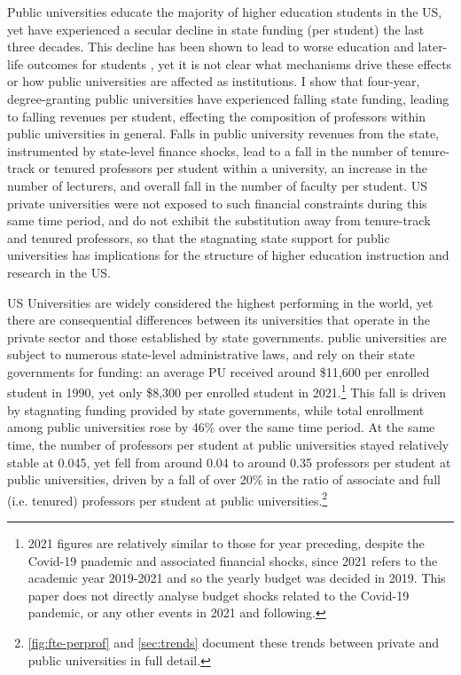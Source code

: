 \documentclass[notitlepage,12pt]{article}
\begin{document}
\noindent
Public universities educate the majority of higher education students in the US, yet have experienced a secular decline in state funding (per student) the last three decades.
This decline has been shown to lead to worse education and later-life outcomes for students \citep{NBERw23736,NBERw27885}, yet it is not clear what mechanisms drive these effects or how public universities are affected as institutions.
I show that four-year, degree-granting public universities have experienced falling state funding, leading to falling revenues per student, effecting the composition of professors within public universities in general.
Falls in public university revenues from the state, instrumented by state-level finance shocks, lead to a fall in the number of tenure-track or tenured professors per student within a university, an increase in the number of lecturers, and overall fall in the number of faculty per student.
US private universities were not exposed to such financial constraints during this same time period, and do not exhibit the substitution away from tenure-track and tenured professors, so that the stagnating state support for public universities has implications for the structure of higher education instruction and research in the US.

US Universities are widely considered the highest performing in the world, yet there are consequential differences between its universities that operate in the private sector and those established by state governments.
public universities are subject to numerous state-level administrative laws, and rely on their state governments for funding: an average PU received around \$11,600 per enrolled student in 1990, yet only \$8,300 per enrolled student in 2021.\footnote{
    2021 figures are relatively similar to those for year preceding, despite the Covid-19 pnademic and associated financial shocks, since 2021 refers to the academic year 2019-2021 and so the yearly budget was decided in 2019.
    This paper does not directly analyse budget shocks related to the Covid-19 pandemic, or any other events in 2021 and following.
}
This fall is driven by stagnating funding provided by state governments, while total enrollment among public universities rose by 46\% over the same time period.
At the same time, the number of professors per student at public universities stayed relatively stable at 0.045, yet fell from around 0.04 to around 0.35 professors per student at public universities, driven by a fall of over 20\% in the ratio of associate and full (i.e. tenured) professors per student at public universities.\footnote{
    \autoref{fig:fte-perprof} and \autoref{sec:trends} document these trends between private and public universities in full detail.
}
\end{document}
